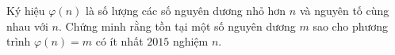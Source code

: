\ifshowproblem
\begin{problem}\label{example:USA-2015-TSTST-P5}
    Ký hiệu \( \varphi(n) \) là số lượng các số nguyên dương nhỏ hơn \( n \) và nguyên tố cùng nhau với \( n \).  
    Chứng minh rằng tồn tại một số nguyên dương \( m \) sao cho phương trình \( \varphi(n) = m \) có ít nhất \( 2015 \) nghiệm \( n \).
\end{problem}
\fi

\footnotemark
{}
\fi